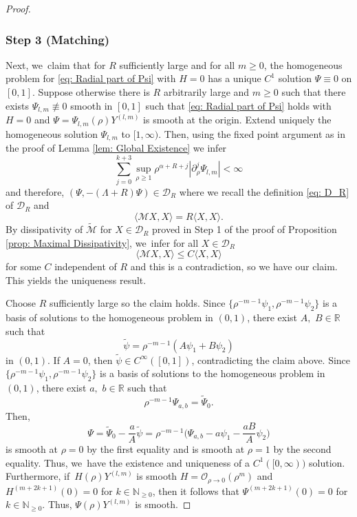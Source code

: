 \documentclass[10pt]{amsart}
\theoremstyle{plain}
\theoremstyle{definition}
\begin{document}
\begin{proof}
\subsubsection*{Step 3 (Matching)}
Next, we~claim that for $R$ sufficiently large and for all $m\ge0$, the homogeneous problem for \eqref{eq: Radial part of Psi} with $H=0$ has a unique $C^1$ solution $\Psi\equiv0$ on $[0,1]$. Suppose otherwise \ie there is $R$ arbitrarily large and $m\ge0$ such that there exists $\Psi_{l,m}\not\equiv 0$ smooth in $[0,1]$ such that \eqref{eq: Radial part of Psi} holds with $H=0$ and $\Psi=\Psi_{l,m}(\rho)Y^{(l,m)}$ is smooth at the origin. Extend uniquely the homogeneous solution $\Psi_{l,m}$ to $[1,\infty)$. Then, using the fixed point argument as in the proof of Lemma \ref{lem: Global Existence} we infer
\[
\sum_{j=0}^{k+3}{}\sup_{\rho\ge1}\rho^{\alpha+R+j}|\partial_
\rho^j\Psi_{l,m}|<\infty
\]
and therefore, $(\Psi,-(\Lambda+R)\Psi)\in \mathcal D_R$ where we recall the definition \eqref{eq: D_R} of $\mathcal D_R$ and
\[
\langle \mathcal MX,X\rangle=R\langle X,X\rangle.
\]
By dissipativity of $\tilde{\mathcal M}$ for $X\in \mathcal D_R$ proved in Step 1 of the proof of Proposition \ref{prop: Maximal Dissipativity}, we~infer for all $X\in \mathcal D_R$
\[
\langle \mathcal M X,X\rangle\le C \langle X,X\rangle
\]
for some $C$ independent of $R$ and this is a contradiction, so we have our claim. This yields the uniqueness result.

Choose $R$ sufficiently large so the claim holds. Since $\{\rho^{-m-1}\psi_1,\rho^{-m-1}\psi_2\}$ is a basis of solutions to the homogeneous problem in $(0,1)$, there exist $A,$ $B\in\mathbb R$ such that
\[
\tilde\psi=\rho^{-m-1}(A\psi_1+B\psi_2)
\]
in $(0,1)$. If $A=0$, then $\tilde \psi\in C^\infty([0,1])$, contradicting the claim above. Since $\{\rho^{-m-1}\psi_1,\rho^{-m-1}\psi_2\}$ is a basis of solutions to the homogeneous problem in $(0,1)$, there exist $a,$ $b\in\mathbb R$ such that
\[
\rho^{-m-1}\Psi_{a,b}=\tilde \Psi_0.
\]
Then,
\[
\Psi=\tilde \Psi_0-\frac{a}{A}\tilde\psi=\rho^{-m-1} \Big(\Psi_{a,b}-a\psi_1-\frac{aB}{A}\psi_2 \Big)
\]
is smooth at $\rho=0$ by the first equality and is smooth at $\rho=1$ by the second equality. Thus, we~have the existence and uniqueness of a $C^1([0,\infty))$ solution. Furthermore, if~$H(\rho)Y^{(l,m)}$ is smooth \ie $H=\mathcal O_{\rho\to 0}(\rho^m)$ and $H^{(m+2k+1)}(0)=0$ for $k\in\mathbb N_{\ge 0}$, then it follows that $\Psi^{(m+2k+1)}(0)=0$ for $k\in\mathbb N_{\ge 0}$. Thus, $\Psi(\rho)Y^{(l,m)}$ is smooth.
\end{proof}
\end{document}

